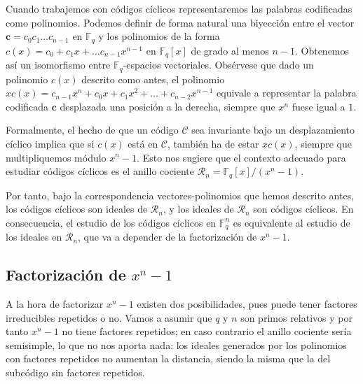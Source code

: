 
Cuando trabajemos con códigos cíclicos representaremos las palabras codificadas como polinomios.
Podemos definir de forma natural una biyección entre el vector \(\mathbf c = c_0c_1\dots c_{n-1}\) en \(\mathbb F_q\) y los polinomios de la forma \(c(x) = c_0 + c_1x + \dots c_{n-1}x^{n-1}\) en \(\mathbb F_q[x]\) de grado al menos \(n-1\). 
Obtenemos así un isomorfismo entre \(\mathbb F_q\)-espacios vectoriales.
Obsérvese que dado un polinomio \(c(x)\) descrito como antes, el polinomio \(xc(x) = c_{n-1}x^n + c_0x + c_1x^2 + \dots + c_{n-2}x^{n-1}\) equivale a representar la palabra codificada \(\mathbf c\) desplazada una posición a la derecha, siempre que \(x^n\) fuese igual a \(1\).

Formalmente, el hecho de que un código \(\mathcal C\) sea invariante bajo un desplazamiento cíclico implica que si \(c(x)\) está en \(\mathcal C\), también ha de estar \(xc(x)\), siempre que multipliquemos módulo \(x^n -1\). 
Esto nos sugiere que el contexto adecuado para estudiar códigos cíclicos es el anillo cociente \(\mathcal R_n = \mathbb F_q[x]/(x^n - 1)\).

Por tanto, bajo la correspondencia vectores-polinomios que hemos descrito antes, los códigos cíclicos son ideales de \(\mathcal R_n\), y los ideales de \(\mathcal R_n\) son códigos cíclicos.
En consecuencia, el estudio de los códigos cíclicos en \(\mathbb F_q^n\) es equivalente al estudio de los ideales en \(\mathcal R_n\), que va a depender de la factorización de \(x^n-1\).

\subsection{Factorización de \texorpdfstring{\(x^n -1\)}{xn - 1}}

\label{sec:factorizacion-xn-1}

A la hora de factorizar \(x^n -1\) existen dos posibilidades, pues puede tener factores irreducibles repetidos o no.
Vamos a asumir que \(q\) y \(n\) son primos relativos y por tanto \(x^n - 1\) no tiene factores repetidos; en caso contrario el anillo cociente sería semisimple, lo que no nos aporta nada: los ideales generados por los polinomios con factores repetidos no aumentan la distancia, siendo la misma que la del subcódigo sin factores repetidos.

